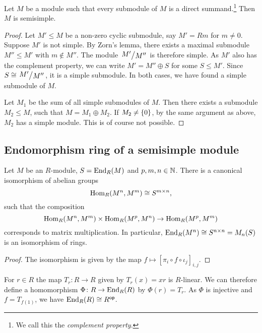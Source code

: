 \begin{trditev}
Let $M$ be a module such that every submodule of $M$ is a direct
summand.\footnote{We call this the \emph{complement property}.}
Then $M$ is semisimple.
\end{trditev}

\begin{proof}
Let $M' \leq M$ be a non-zero cyclic submodule, say $M' = Rm$ for
$m \ne 0$. Suppose $M'$ is not simple. By Zorn's lemma, there
exists a maximal submodule $M'' \leq M'$ with $m \not \in M''$. The
module $\kvoc{M'}{M''}$ is therefore simple. As $M'$ also has the
complement property, we can write $M' = M'' \oplus S$ for some
$S \leq M'$. Since $S \cong \kvoc{M'}{M''}$, it is a simple
submodule. In both cases, we have found a simple submodule of $M$.

Let $M_1$ be the sum of all simple submodules of $M$. Then there
exists a submodule $M_2 \leq M$, such that $M = M_1 \oplus M_2$.
If $M_2 \ne \left\{0\right\}$, by the same argument as above, $M_2$ has a
simple module. This is of course not possible.
\end{proof}

\newpage

\subsection{Endomorphism ring of a semisimple module}

\begin{trditev}
Let $M$ be an $R$-module, $S = \operatorname{End}_R(M)$ and $p, m, n \in \mathbb{N}$.
There is a canonical isomorphism of abelian groups
\[
\operatorname{Hom}_R(M^n, M^m) \cong S^{m \times n},
\]
such that the composition
\[
\operatorname{Hom}_R(M^n, M^m) \times \operatorname{Hom}_R(M^p, M^n) \to \operatorname{Hom}_R(M^p, M^m)
\]
corresponds to matrix multiplication. In particular,
$\operatorname{End}_R(M^n) \cong S^{n \times n} = M_n(S)$ is an isomorphism of
rings.
\end{trditev}

\begin{proof}
The isomorphism is given by the map
$f \mapsto [\pi_i \circ f \circ \iota_j]_{i,j}$.
\end{proof}

\begin{opomba}
For $r \in R$ the map $T_r \colon R \to R$ given by $T_r(x) = xr$
is $R$-linear. We can therefore define a homomorphism
$\Phi \colon R \to \operatorname{End}_R(R)$ by $\Phi(r) = T_r$. As
$\Phi$ is injective and $f = T_{f(1)}$, we have
$\operatorname{End}_R(R) \cong R^{\mathsf{op}}$.
\end{opomba}

